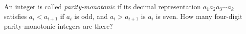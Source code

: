 An integer is called \textit{parity-monotonic} if its decimal representation $a_{1}a_{2}a_{3}\cdots a_{k}$ satisfies $a_{i}<a_{i+1}$ if $a_{i}$ is odd, and $a_{i}>a_{i+1}$ is $a_{i}$ is even. How many four-digit parity-monotonic integers are there?